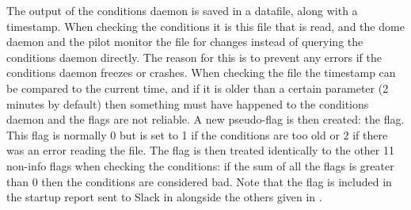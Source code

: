\begin{colsection}
\begin{colsection}
The output of the conditions daemon is saved in a datafile, along with a timestamp. When checking the conditions it is this file that is read, and the dome daemon and the pilot monitor the file for changes instead of querying the conditions daemon directly. The reason for this is to prevent any errors if the conditions daemon freezes or crashes. When checking the file the timestamp can be compared to the current time, and if it is older than a certain parameter (2 minutes by default) then something must have happened to the conditions daemon and the flags are not reliable. A new pseudo-flag is then created: the  flag. This flag is normally 0 but is set to 1 if the conditions are too old or 2 if there was an error reading the file. The  flag is then treated identically to the other 11 non-info flags when checking the conditions: if the sum of all the flags is greater than 0 then the conditions are considered bad. Note that the  flag is included in the startup report sent to Slack in  alongside the others given in .

\end{colsection}


\end{colsection}


\newpage
